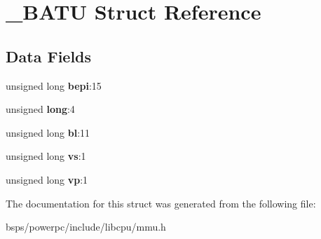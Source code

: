 \hypertarget{struct__BATU}{}\section{\+\_\+\+B\+A\+TU Struct Reference}
\label{struct__BATU}
\subsection*{Data Fields}
\begin{DoxyCompactItemize}
\item 
\mbox{\label{struct__BATU_a93c0de319fc1f2a42730a7c8beddcaab}} 
unsigned long {\bfseries bepi}\+:15
\item 
\mbox{\label{struct__BATU_a9dd45ef522b304e41953b493aa50db32}} 
unsigned {\bfseries long}\+:4
\item 
\mbox{\label{struct__BATU_a077e3c5c1eccdadda621a28207df7a47}} 
unsigned long {\bfseries bl}\+:11
\item 
\mbox{\label{struct__BATU_a12491b3e4a1753fb934b7aa8f31ffd5d}} 
unsigned long {\bfseries vs}\+:1
\item 
\mbox{\label{struct__BATU_aabdbfb50851d6e9bfc15e1594a9c3bd1}} 
unsigned long {\bfseries vp}\+:1
\end{DoxyCompactItemize}


The documentation for this struct was generated from the following file\+:\begin{DoxyCompactItemize}
\item 
bsps/powerpc/include/libcpu/mmu.\+h\end{DoxyCompactItemize}
